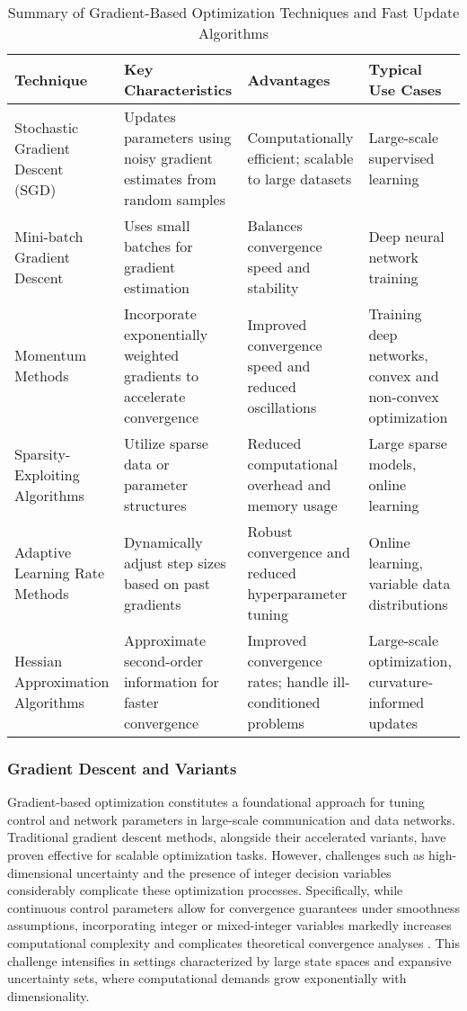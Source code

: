 \documentclass[sigconf]{acmart}
\begin{document}
\begin{table*}[htbp]
\centering
\caption{Summary of Gradient-Based Optimization Techniques and Fast Update Algorithms}
\label{tab:gradient_optimization_summary}
\begin{adjustbox}{max width=\textwidth}
\begin{tabular}{@{}llll@{}}
\toprule
\textbf{Technique} & \textbf{Key Characteristics} & \textbf{Advantages} & \textbf{Typical Use Cases} \\ 
\midrule
Stochastic Gradient Descent (SGD) & Updates parameters using noisy gradient estimates from random samples & Computationally efficient; scalable to large datasets & Large-scale supervised learning \\ 
Mini-batch Gradient Descent & Uses small batches for gradient estimation & Balances convergence speed and stability & Deep neural network training \\ 
Momentum Methods & Incorporate exponentially weighted gradients to accelerate convergence & Improved convergence speed and reduced oscillations & Training deep networks, convex and non-convex optimization \\ 
Sparsity-Exploiting Algorithms & Utilize sparse data or parameter structures & Reduced computational overhead and memory usage & Large sparse models, online learning \\ 
Adaptive Learning Rate Methods & Dynamically adjust step sizes based on past gradients & Robust convergence and reduced hyperparameter tuning & Online learning, variable data distributions \\ 
Hessian Approximation Algorithms & Approximate second-order information for faster convergence & Improved convergence rates; handle ill-conditioned problems & Large-scale optimization, curvature-informed updates \\ 
\bottomrule
\end{tabular}
\end{adjustbox}
\end{table*}

\subsubsection{Gradient Descent and Variants}

Gradient-based optimization constitutes a foundational approach for tuning control and network parameters in large-scale communication and data networks. Traditional gradient descent methods, alongside their accelerated variants, have proven effective for scalable optimization tasks. However, challenges such as high-dimensional uncertainty and the presence of integer decision variables considerably complicate these optimization processes. Specifically, while continuous control parameters allow for convergence guarantees under smoothness assumptions, incorporating integer or mixed-integer variables markedly increases computational complexity and complicates theoretical convergence analyses \cite{ref36}. This challenge intensifies in settings characterized by large state spaces and expansive uncertainty sets, where computational demands grow exponentially with dimensionality.
\end{document}
